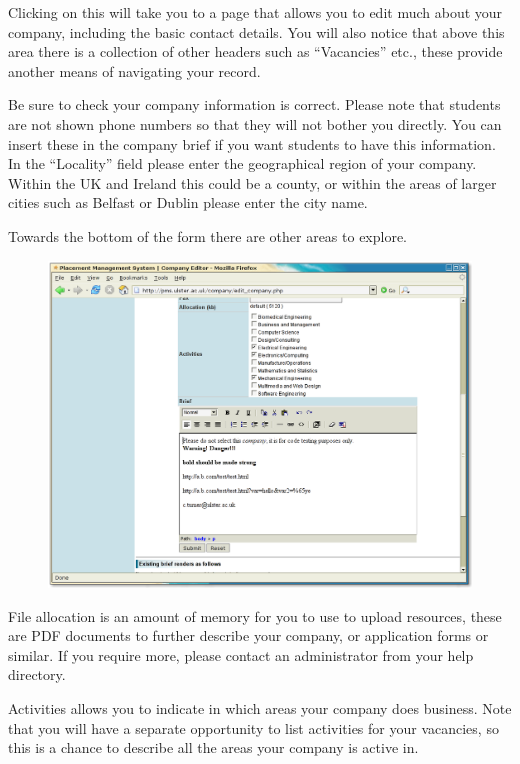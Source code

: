 Clicking on this will take you to a page that allows you to edit much about your company,
including the basic contact details. You will also notice that above this area there is
a collection of other headers such as ``Vacancies'' etc., these provide another means of
navigating your record.

Be sure to check your company information is correct. Please note that students are not
shown phone numbers so that they will not bother you directly. You can insert these in the
company brief if you want students to have this information. In the ``Locality'' field please
enter the geographical region of your company. Within the UK and Ireland this could be a
county, or within the areas of larger cities such as Belfast or Dublin please enter the
city name.

Towards the bottom of the form there are other areas to explore.

\begin{figure}[htb]
\begin{center}
\includegraphics[scale=0.25]{png/company_hr3.png}
\end{center}
\end{figure}


File allocation is an amount of memory for you to use to upload resources, these are PDF
documents to further describe your company, or application forms or similar. If you require more, please contact an administrator
from your help directory.

Activities allows you to indicate in which areas your company does business. Note that you will have a separate opportunity to list activities for your vacancies, so this is a chance to describe all the areas your company is active in.

